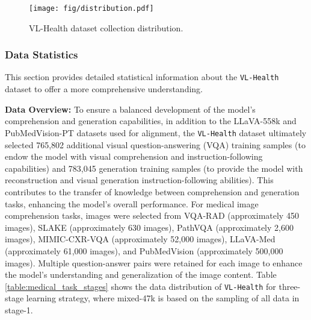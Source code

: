 
\begin{figure}[t]
    \centering
    \texttt{[image: fig/distribution.pdf]}
    \caption{VL-Health dataset collection distribution.}
    \label{fig:human_eval}
    \vskip -0.1in
\end{figure}

\subsubsection{Data Statistics}
This section provides detailed statistical information about the \texttt{VL-Health} dataset to offer a more comprehensive understanding.

\noindent \textbf{Data Overview:} To ensure a balanced development of the model's comprehension and generation capabilities, in addition to the LLaVA-558k and PubMedVision-PT datasets used for alignment, the \texttt{VL-Health} dataset ultimately selected 765,802 additional visual question-answering (VQA) training samples (to endow the model with visual comprehension and instruction-following capabilities) and 783,045 generation training samples (to provide the model with reconstruction and visual generation instruction-following abilities). This contributes to the transfer of knowledge between comprehension and generation tasks, enhancing the model's overall performance. For medical image comprehension tasks, images were selected from VQA-RAD (approximately 450 images), SLAKE (approximately 630 images), PathVQA (approximately 2,600 images), MIMIC-CXR-VQA (approximately 52,000 images), LLaVA-Med (approximately 61,000 images), and PubMedVision (approximately 500,000 images). Multiple question-answer pairs were retained for each image to enhance the model's understanding and generalization of the image content. Table \ref{table:medical_task_stages} shows the data distribution of \texttt{VL-Health} for three-stage learning strategy, where mixed-47k is based on the sampling of all data in stage-1.

